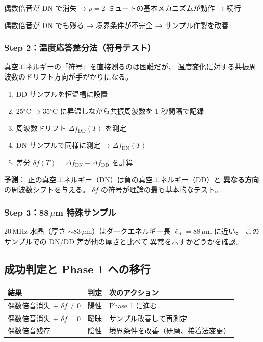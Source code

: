 \documentclass[11pt,a4paper]{article}
\begin{document}
\begin{tcolorbox}[colback=green!5,colframe=green!50!black,title=Phase 0 最初の判定]
偶数倍音が DN で消失 → $p = 2$ ミュートの基本メカニズムが動作 → 続行

偶数倍音が DN でも残る → 境界条件が不完全 → サンプル作製を改善
\end{tcolorbox}

\subsubsection{Step 2：温度応答差分法（符号テスト）}

真空エネルギーの「符号」を直接測るのは困難だが、
温度変化に対する共振周波数のドリフト方向が手がかりになる。

\begin{enumerate}
\item DD サンプルを恒温槽に設置
\item 25$^\circ$C → 35$^\circ$C に昇温しながら共振周波数を 1 秒間隔で記録
\item 周波数ドリフト $\Delta f_{\mathrm{DD}}(T)$ を測定
\item DN サンプルで同様に測定 → $\Delta f_{\mathrm{DN}}(T)$
\item 差分 $\delta f(T) = \Delta f_{\mathrm{DN}} - \Delta f_{\mathrm{DD}}$ を計算
\end{enumerate}

\textbf{予測}：
正の真空エネルギー（DN）は負の真空エネルギー（DD）と
\textbf{異なる方向} の周波数シフトを与える。
$\delta f$ の符号が理論の最も基本的なテスト。

\subsubsection{Step 3：88\,$\mu$m 特殊サンプル}

20\,MHz 水晶（厚さ $\sim 83\,\mu$m）はダークエネルギー長
$\ell_\Lambda = 88\,\mu$m に近い。
このサンプルでの DN/DD 差が他の厚さと比べて
異常を示すかどうかを確認。

\subsection{成功判定と Phase 1 への移行}

\begin{center}
\begin{tabular}{lll}
\toprule
結果 & 判定 & 次のアクション \\
\midrule
偶数倍音消失 + $\delta f \neq 0$ & 陽性 & Phase 1 に進む \\
偶数倍音消失 + $\delta f = 0$ & 曖昧 & サンプル改善して再測定 \\
偶数倍音残存 & 陰性 & 境界条件を改善（研磨、接着法変更） \\
\bottomrule
\end{tabular}
\end{center}
\end{document}
